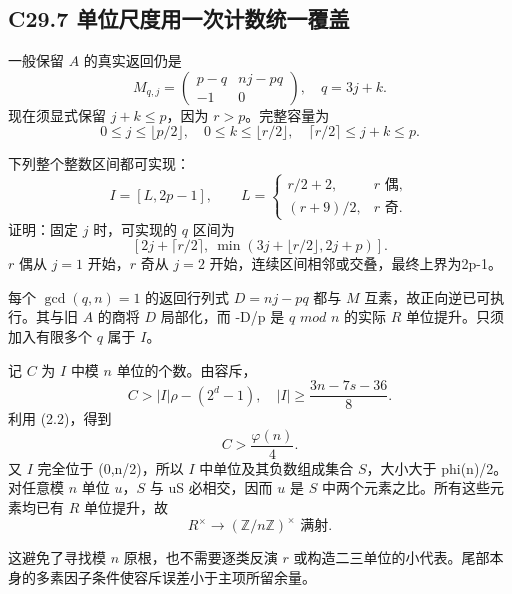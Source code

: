 \documentclass[11pt,a4paper]{article}
\theoremstyle{definition}
\numberwithin{equation}{section}
\begin{document}
\subsection*{\texorpdfstring{{C29.7} {单位尺度用一次计数统一覆盖}}{C29.7 单位尺度用一次计数统一覆盖}}\label{C29-h190}

{一般保留} {\ensuremath{A}} {的真实返回仍是} \[
M_{q,j}=
\begin{pmatrix}p-q&nj-pq\\-1&0\end{pmatrix},\quad q=3j+k.
\] {现在须显式保留} {\ensuremath{j+k\le p}，因为} {\ensuremath{r>p}。完整容量为} \[
0\le j\le\lfloor p/2\rfloor,\quad
0\le k\le\lfloor r/2\rfloor,\quad
\lceil r/2\rceil\le j+k\le p.
\]

{下列整个整数区间都可实现：} \[
I=[L,2p-1],\qquad
L=\begin{cases}
r/2+2,&r\text{ 偶},\\
(r+9)/2,&r\text{ 奇}.
\end{cases}
\tag{C29.7.1}
\] {证明：固定} {\ensuremath{j}} {时，可实现的} {\ensuremath{q}} {区间为} \[
[2j+\lceil r/2\rceil,\ \min(3j+\lfloor r/2\rfloor,2j+p)].
\] {\ensuremath{r}} {偶从} {\ensuremath{j=1}} {开始，\ensuremath{r}} {奇从} {\ensuremath{j=2}} {开始，连续区间相邻或交叠，最终上界为2p-1。}

{每个} {\ensuremath{\operatorname{gcd}(q,n)=1}} {的返回行列式} {\ensuremath{D=nj-pq}} {都与} {\ensuremath{M}} {互素，故正向逆已可执行。其与旧} {\ensuremath{A}} {的商将} {\ensuremath{D}} {局部化，而} {-D/p} {是} {\ensuremath{q}} {\ensuremath{mod}} {\ensuremath{n}} {的实际} {\ensuremath{R}} {单位提升。只须加入有限多个} {\ensuremath{q}} {属于} {\ensuremath{I}。}

{记} {\ensuremath{C}} {为} {\ensuremath{I}} {中模} {\ensuremath{n}} {单位的个数。由容斥，} \[
C>|I|\rho-(2^d-1),\quad
|I|\ge\frac{3n-7s-36}{8}.
\] {利用} {(2.2)，得到} \[
\boxed{C>\frac{\varphi(n)}4.}
\tag{C29.7.2}
\] {又} {\ensuremath{I}} {完全位于} {(0,n/2)，所以} {\ensuremath{I}} {中单位及其负数组成集合} {\ensuremath{S}，大小大于} {phi(n)/2。对任意模} {\ensuremath{n}} {单位} {\ensuremath{u}，\ensuremath{S}} {与} {uS} {必相交，因而} {\ensuremath{u}} {是} {\ensuremath{S}} {中两个元素之比。所有这些元素均已有} {\ensuremath{R}} {单位提升，故} \[
\boxed{R^\times\longrightarrow(\mathbb Z/n\mathbb Z)^\times
\text{ 满射}.}
\tag{C29.7.3}
\]

{这避免了寻找模} {\ensuremath{n}} {原根，也不需要逐类反演} {\ensuremath{r}} {或构造二三单位的小代表。尾部本身的多素因子条件使容斥误差小于主项所留余量。}
\end{document}
